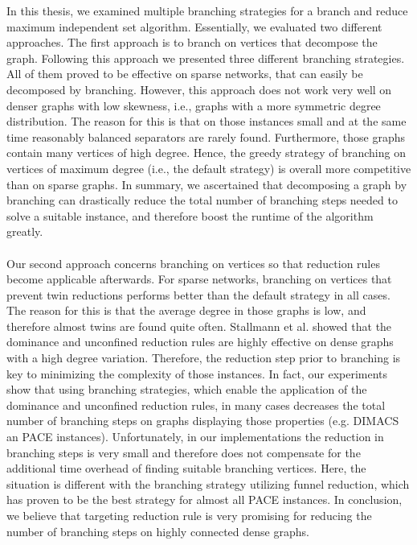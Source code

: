 \documentclass[12pt,a4paper,twoside]{scrartcl}
\numberwithin{equation}{section}
\begin{document}
In this thesis, we examined multiple branching strategies for a branch and reduce maximum independent set algorithm. Essentially, we evaluated two different approaches. The first approach is to branch on vertices that decompose the graph. Following this approach we presented three different branching strategies. All of them proved to be effective on sparse networks, that can easily be decomposed by branching. However, this approach does not work very well on denser graphs with low skewness, i.e., graphs with a more symmetric degree distribution. The reason for this is that on those instances small and at the same time reasonably balanced separators are rarely found. Furthermore, those graphs contain many vertices of high degree. Hence, the greedy strategy of branching on vertices of maximum degree (i.e., the default strategy) is overall more competitive than on sparse graphs. In summary, we ascertained that decomposing a graph by branching can drastically reduce the total number of branching steps needed to solve a suitable instance, and therefore boost the runtime of the algorithm greatly.

\paragraph{}
Our second approach concerns branching on vertices so that reduction rules become applicable afterwards. For sparse networks, branching on vertices that prevent twin reductions performs better than the default strategy in all cases. The reason for this is that the average degree in those graphs is low, and therefore almost twins are found quite often. Stallmann et al. \cite{Stallmann} showed that the dominance and unconfined reduction rules are highly effective on dense graphs with a high degree variation. Therefore, the reduction step prior to branching is key to minimizing the complexity of those instances. In fact, our experiments show that using branching strategies, which enable the application of the dominance and unconfined reduction rules, in many cases decreases the total number of branching steps on graphs displaying those properties (e.g. DIMACS an PACE instances). Unfortunately, in our implementations the reduction in branching steps is very small and therefore does not compensate for the additional time overhead of finding suitable branching vertices. Here, the situation is different with the branching strategy utilizing funnel reduction, which has proven to be the best strategy for almost all PACE instances. In conclusion, we believe that targeting reduction rule is very promising for reducing the number of branching steps on highly connected dense graphs.
\end{document}
